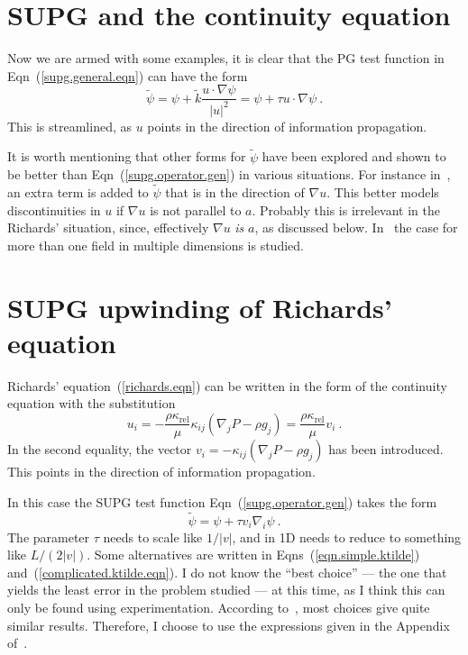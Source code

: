 \documentclass[]{scrreprt}
\begin{document}
\section{SUPG and the continuity equation}

Now we are armed with some examples, it is clear that the PG test
function in Eqn~(\ref{supg.general.eqn}) can have the form
\begin{equation}
\tilde{\psi} = \psi + \tilde{k} \frac{u\cdot\nabla\psi}{|u|^{2}} =
\psi + \tau u\cdot\nabla\psi \ .
\label{supg.operator.gen}
\end{equation}
This is streamlined, as $u$ points in the direction of information
propagation.


It is worth mentioning that other forms for $\tilde{\psi}$ have been
explored and shown to be better than Eqn~(\ref{supg.operator.gen}) in
various situations.  For instance in~\cite{hughesET1986}, an extra
term is added to $\tilde{\psi}$ that is in the direction of $\nabla
u$.  This better models discontinuities in $u$ if $\nabla u$ is not
parallel to $a$.  Probably this is irrelevant in the Richards'
situation, since, effectively $\nabla u$ {\em is} $a$, as discussed
below.  In~\cite{hughes1986} the case for more than one field in
multiple dimensions is studied.


\section{SUPG upwinding of Richards' equation}

Richards' equation~(\ref{richards.eqn}) can be written in the form of
the continuity equation  with the substitution
\begin{equation}
u_{i} = -\frac{\rho\kappa_{\mathrm{rel}}}{\mu}\kappa_{ij}(\nabla_{j}P
- \rho g_{j}) = \frac{\rho\kappa_{\mathrm{rel}}}{\mu}v_{i}\ .
\end{equation}
In the second equality, the vector $v_{i} = -\kappa_{ij}(\nabla_{j}P -
\rho g_{j})$ has been introduced.  This points in the direction of
information propagation.

In this case the SUPG test function Eqn~(\ref{supg.operator.gen})
takes the form
\begin{equation}
\tilde{\psi} = \psi + \tau v_{i}\nabla_{i}\psi \ .
\end{equation}
The parameter $\tau$ needs to scale like $1/|v|$, and in 1D needs to
reduce to something like $L/(2|v|)$.  Some
alternatives are written in Eqns~(\ref{eqn.simple.ktilde})
and~(\ref{complicated.ktilde.eqn}).  I do not know the ``best choice''
--- the one that yields the least error in the problem studied --- at
this time, as I think this can only be found using experimentation.
According to~\cite{brooks1982}, most choices give quite similar results.
Therefore, I choose to use the expressions given in the Appendix
of~\cite{hughesET1986}.
\end{document}
